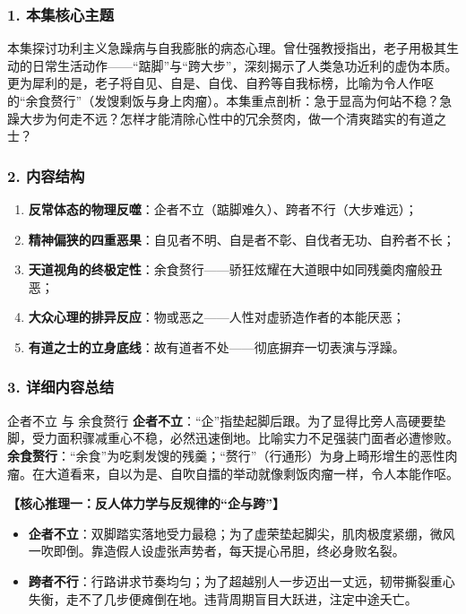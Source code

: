 \subsubsection{1. 本集核心主题}
本集探讨功利主义急躁病与自我膨胀的病态心理。曾仕强教授指出，老子用极其生动的日常生活动作——“踮脚”与“跨大步”，深刻揭示了人类急功近利的虚伪本质。更为犀利的是，老子将自见、自是、自伐、自矜等自我标榜，比喻为令人作呕的“余食赘行”（发馊剩饭与身上肉瘤）。本集重点剖析：急于显高为何站不稳？急躁大步为何走不远？怎样才能清除心性中的冗余赘肉，做一个清爽踏实的有道之士？

\subsubsection{2. 内容结构}
\begin{enumerate}
    \item \textbf{反常体态的物理反噬}：企者不立（踮脚难久）、跨者不行（大步难远）；
    \item \textbf{精神偏狭的四重恶果}：自见者不明、自是者不彰、自伐者无功、自矜者不长；
    \item \textbf{天道视角的终极定性}：余食赘行——骄狂炫耀在大道眼中如同残羹肉瘤般丑恶；
    \item \textbf{大众心理的排异反应}：物或恶之——人性对虚骄造作者的本能厌恶；
    \item \textbf{有道之士的立身底线}：故有道者不处——彻底摒弃一切表演与浮躁。
\end{enumerate}

\subsubsection{3. 详细内容总结}

\begin{ConceptBox}{企者不立 与 余食赘行}
\textbf{企者不立}：“企”指垫起脚后跟。为了显得比旁人高硬要垫脚，受力面积骤减重心不稳，必然迅速倒地。比喻实力不足强装门面者必遭惨败。\\
\textbf{余食赘行}：“余食”为吃剩发馊的残羹；“赘行”（行通形）为身上畸形增生的恶性肉瘤。在大道看来，自以为是、自吹自擂的举动就像剩饭肉瘤一样，令人本能作呕。
\end{ConceptBox}

\noindent\textbf{【核心推理一：反人体力学与反规律的“企与跨”】}
\begin{itemize}
    \item \textbf{企者不立}：双脚踏实落地受力最稳；为了虚荣垫起脚尖，肌肉极度紧绷，微风一吹即倒。靠造假人设虚张声势者，每天提心吊胆，终必身败名裂。
    \item \textbf{跨者不行}：行路讲求节奏均匀；为了超越别人一步迈出一丈远，韧带撕裂重心失衡，走不了几步便瘫倒在地。违背周期盲目大跃进，注定中途夭亡。
\end{itemize}

